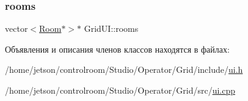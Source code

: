 \mbox{\label{class_grid_u_i_ad23d09850beb8360fbeaaa434a38abb6}} 
\subsubsection{\texorpdfstring{rooms}{rooms}}
{\footnotesize\ttfamily vector$<$\hyperlink{class_room}{Room}$\ast$$>$$\ast$ Grid\+U\+I\+::rooms\hspace{0.3cm}{\ttfamily [private]}}



Объявления и описания членов классов находятся в файлах\+:\begin{DoxyCompactItemize}
\item 
/home/jetson/controlroom/\+Studio/\+Operator/\+Grid/include/\hyperlink{_operator_2_grid_2include_2ui_8h}{ui.\+h}\item 
/home/jetson/controlroom/\+Studio/\+Operator/\+Grid/src/\hyperlink{_operator_2_grid_2src_2ui_8cpp}{ui.\+cpp}\end{DoxyCompactItemize}
